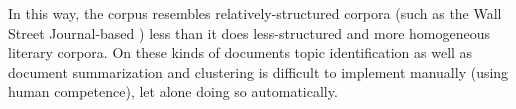 In this way, the corpus resembles relatively-structured corpora (such as the Wall Street Journal-based ) less than it does less-structured and more homogeneous literary corpora. On these kinds of documents topic identification as well as document summarization and clustering is difficult to implement manually (using human competence), let alone doing so automatically.
